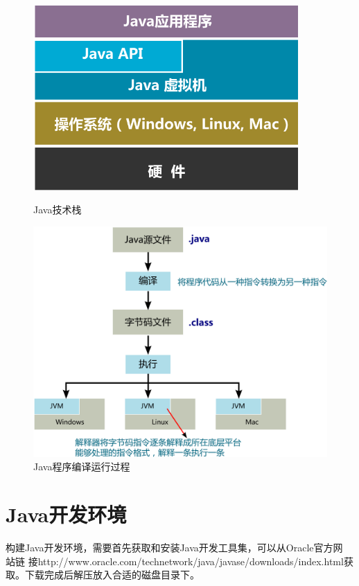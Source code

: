 \begin{figure}[htb]
  \begin{minipage}[t]{0.4\linewidth}
    \centering
    \includegraphics[width=0.9\textwidth]{images/Introduction-to-Java/fig-java-tech-stack.pdf}
    \caption{Java技术栈}
    \label{fig:java-tech-stack}
  \end{minipage}
  \begin{minipage}[t]{0.6\linewidth}
    \centering
    \includegraphics[width=\textwidth]{images/Introduction-to-Java/fig-java-running-process.pdf}
    \caption{Java程序编译运行过程}
    \label{fig:java-running-process}
  \end{minipage}
\end{figure}

\section{Java开发环境}
构建Java开发环境，需要首先获取和安装Java开发工具集，可以从Oracle官方网
站链
接http://www.oracle.com/technetwork/java/javase/downloads/index.html获
取。下载完成后解压放入合适的磁盘目录下。

